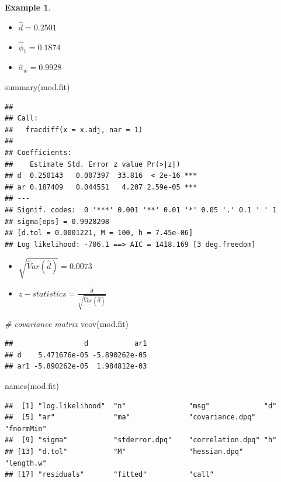 \documentclass[
]{book}
\newenvironment{Shaded}{\begin{snugshade}}{\end{snugshade}}
\newcommand{\CommentTok}[1]{\textcolor[rgb]{0.56,0.35,0.01}{\textit{#1}}}
\newcommand{\FunctionTok}[1]{\textcolor[rgb]{0.00,0.00,0.00}{#1}}
\newcommand{\NormalTok}[1]{#1}
\theoremstyle{definition}
\theoremstyle{definition}
\newtheorem{example}{Example}[chapter]
\theoremstyle{definition}
\theoremstyle{definition}
\theoremstyle{remark}
\begin{document}
\begin{example}
\begin{itemize}
\item
  \(\hat d=0.2501\)
\item
  \(\hat \phi_1=0.1874\)
\item
  \(\hat \sigma_w=0.9928\)
\end{itemize}

\begin{Shaded}
\begin{Highlighting}[]
\FunctionTok{summary}\NormalTok{(mod.fit)}
\end{Highlighting}
\end{Shaded}

\begin{verbatim}
## 
## Call:
##   fracdiff(x = x.adj, nar = 1) 
## 
## Coefficients:
##    Estimate Std. Error z value Pr(>|z|)    
## d  0.250143   0.007397  33.816  < 2e-16 ***
## ar 0.187409   0.044551   4.207 2.59e-05 ***
## ---
## Signif. codes:  0 '***' 0.001 '**' 0.01 '*' 0.05 '.' 0.1 ' ' 1
## sigma[eps] = 0.9928298 
## [d.tol = 0.0001221, M = 100, h = 7.45e-06]
## Log likelihood: -706.1 ==> AIC = 1418.169 [3 deg.freedom]
\end{verbatim}

\begin{itemize}
\item
  \(\sqrt{\hat Var(\hat d)}=0.0073\)
\item
  \(z-statistics=\frac{\hat d}{\sqrt{\hat Var(\hat d)}}\)
\end{itemize}

\begin{Shaded}
\begin{Highlighting}[]
\CommentTok{\# covariance matrix}
\FunctionTok{vcov}\NormalTok{(mod.fit)}
\end{Highlighting}
\end{Shaded}

\begin{verbatim}
##                 d           ar1
## d    5.471676e-05 -5.890262e-05
## ar1 -5.890262e-05  1.984812e-03
\end{verbatim}

\begin{Shaded}
\begin{Highlighting}[]
\FunctionTok{names}\NormalTok{(mod.fit)}
\end{Highlighting}
\end{Shaded}

\begin{verbatim}
##  [1] "log.likelihood"  "n"               "msg"             "d"              
##  [5] "ar"              "ma"              "covariance.dpq"  "fnormMin"       
##  [9] "sigma"           "stderror.dpq"    "correlation.dpq" "h"              
## [13] "d.tol"           "M"               "hessian.dpq"     "length.w"       
## [17] "residuals"       "fitted"          "call"
\end{verbatim}


\end{example}
\end{document}
